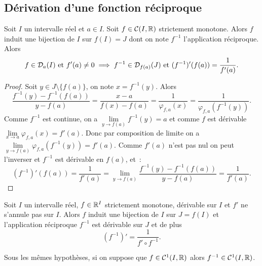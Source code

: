 \subsection{Dérivation d'une fonction réciproque}

\begin{theo}
  Soit \(I\) un intervalle réel et \(a \in I\). Soit \(f \in \mathcal{C}(I,\mathbb{R})\)
  strictement monotone. Alors \(f\) induit une bijection de \(I\) sur \(f(I)=J\)
  dont on note \(f^{-1}\) l'application réciproque. Alors
  \begin{equation}
    f \in \mathcal{D}_{a}(I) \text{~et~} f'(a) \neq 0 \implies f^{-1} \in \mathcal{D}_{f(a)}(J)
    \text{~et~} (f^{-1})'(f(a))=\frac{1}{f'(a)}.
  \end{equation}
\end{theo}
\begin{proof}
  Soit \(y \in J \setminus \{f(a)\}\), on note \(x=f^{-1}(y)\). Alors
  \begin{equation}
    \frac{f^{-1}(y)-f^{-1}(f(a))}{y-f(a)}=\frac{x-a}{f(x)-f(a)} =
    \frac{1}{\varphi_{f,a}(x)}=\frac{1}{\varphi_{f,a}(f^{-1}(y))}.
  \end{equation}
  Comme \(f^{-1}\) est continue, on a \(\lim\limits_{y \to f(a)}f^{-1}(y) = a\)
  et comme \(f\) est dérivable \(\lim\limits_{x \to a} \varphi_{f,a}(x)=f'(a)\).
  Donc par composition de limite on a \(\lim\limits_{y \to
  f(a)}\varphi_{f,a}(f^{-1}(y))=f'(a)\). Comme \(f'(a)\) n'est pas nul on peut
  l'inverser et \(f^{-1}\) est dérivable en \(f(a)\), et~:
  \begin{equation}
    (f^{-1})'(f(a))=\frac{1}{f'(a)} = \lim\limits_{y \to f(a)}
    \frac{f^{-1}(y)-f^{-1}(f(a))}{y-f(a)} = \frac{1}{f'(a)}.
  \end{equation}
\end{proof}
\begin{corth}
  Soit \(I\) un intervalle réel, \(f \in \mathbb{R}^I\) strictement monotone, dérivable
  sur \(I\) et \(f'\) ne s'annule pas sur \(I\). Alors \(f\) induit une
  bijection de \(I\) sur \(J=f(I)\) et l'application réciproque \(f^{-1}\) est
  dérivable sur \(J\) et de plus
  \begin{equation}
    (f^{-1})'=\frac{1}{f' \circ f^{-1}}.
  \end{equation}
\end{corth}
\begin{corth}
  Sous les mêmes hypothèses, si on suppose que \(f \in \mathcal{C}^{1}(I,\mathbb{R})\) alors
  \(f^{-1} \in \mathcal{C}^{1}(I,\mathbb{R})\).
\end{corth}

